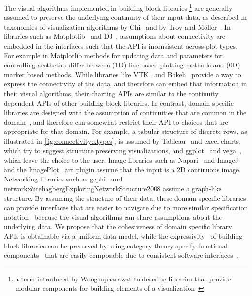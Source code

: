 \documentclass{vgtc}
\theoremstyle{definition}
\theoremstyle{remark}
\begin{document}
The visual algorithms implemented in building block libraries \footnote{a term introduced by Wongsuphasawat to describe libraries that provide modular components for building elements of a visualization~\cite{wongsuphasawatNavigatingWideWorld2021,wongsuphasawatNavigatingWideWorld2020}} are generally assumed to preserve the underlying continuity of their input data, as described in taxonomies of visualization algorithms by Chi~\cite{chiTaxonomyVisualizationTechniques2000} and by Troy and M\"{o}ller~\cite{toryRethinkingVisualizationHighlevel2004}. 
In libraries such as Matplotlib~\cite{hunterMatplotlib2DGraphics2007} and D3~\cite{bostockD3DataDrivenDocuments2011}, assumptions about connectivity are embedded in the interfaces such that the API is inconsistent across plot types. For example in Matplotlib methods for updating data and parameters for controlling aesthetics differ between (1D) line based plotting methods and (0D) marker based methods. While libraries like VTK~\cite{hanwellVisualizationToolkitVTK2015,geveciVTK2012} and Bokeh~\cite{bokehdevelopmentteamBokehPythonLibrary2020} provide a way to express the connectivity of the data, and therefore can embed that information in their visual algorithms, their charting APIs are similar to the continuity dependent APIs of other building block libraries. 
In contrast, domain specific libraries are designed with the assumption of continuities that are common in the domain~\cite{heerSoftwareDesignPatterns2006}, and therefore can somewhat restrict their API to choices that are appropriate for that domain. For example, a tabular structure of discrete rows, as illustrated in \autoref{fig:connectivity:ktypes}, is assumed by Tableau~\cite{stoltePolarisSystemQuery2002, hanrahanVizQLLanguageQuery2006, mackinlayShowMeAutomatic2007} and excel charts, which try to suggest structure preserving visualizations, and ggplot~\cite{wickhamGgplot2ElegantGraphics2016} and vega~\cite{satyanarayanDeclarativeInteractionDesign2014}, which leave the choice to the user. Image libraries such as Napari~\cite{sofroniewNapariNapari045rc12021} and ImageJ~\cite{schneiderNIHImageImageJ2012} and the ImagePlot~\cite{studiesCulturevisImageplot2021} art plugin assume that the input is a 2D continuous image. Networking libraries such as gephi~\cite{bastianGephiOpenSource2009} and networkx\~cite{hagbergExploringNetworkStructure2008} assume a graph-like structure. By assuming the structure of their data, these domain specific libraries can provide interfaces that are easier to navigate due to more similar specification notation~\cite{kruchtenMetricsBasedEvaluationComparison2024} because the visual algorithms can share assumptions about the underlying data. We propose that the cohesiveness of domain specific library APIs is obtainable via a uniform data model, while the expressivity~\cite{mackinlayAutomatingDesignGraphical1986} of building block libraries can be preserved by using category theory specify functional components~\cite{huHowFunctionalProgramming2015, hughesWhyFunctionalProgramming1989} that are easily composable due to consistent software interfaces~\cite{wielsManagementEvolvingSpecifications1998,yorgeyMonoidsThemeVariations2012}.
\end{document}
